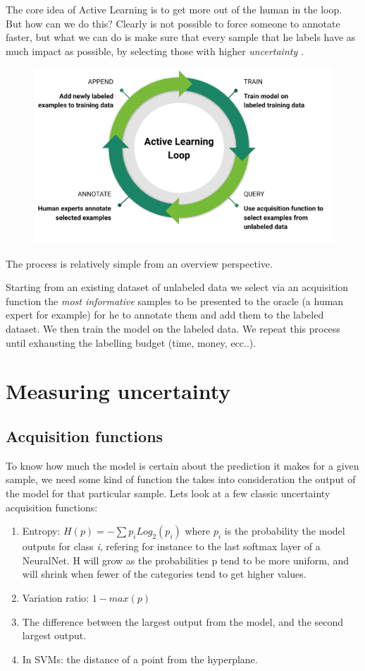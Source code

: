 \documentclass{article}
\begin{document}
\begin{flushleft}
The core idea of Active Learning is to get more out of the human in the loop.
But how can we do this?
Clearly is not possible to force someone to annotate faster, but what we can do is make sure 
that every sample that he labels have as much impact as possible, by selecting those with higher \emph{uncertainty} .


\begin{figure}[h]
    \centering
    \includegraphics[scale=0.5]{AL-loop}
\end{figure}

The process is relatively simple from an overview perspective.

Starting from an existing dataset of unlabeled data we select via an acquisition 
function the \emph{most informative} samples to be presented to the oracle (a human expert for example) 
for he to annotate them and add them to the labeled dataset. We then train the model on the labeled data. 
We repeat this process until exhausting the labelling budget (time, money, ecc..).

\section{Measuring uncertainty}
\subsection{Acquisition functions}
To know how much the model is certain about the prediction it makes for a given sample, 
we need some kind of function the takes into consideration the output of the model for that particular sample.
Lets look at a few classic uncertainty acquisition functions:
\begin{enumerate}
    \item Entropy: $H(p) = - \sum{p_iLog_2(p_i)}$ where $p_i$ is the probability the model outputs for class \emph{i}, 
    refering for instance to the last softmax layer of a NeuralNet.
    H will grow as the probabilities p tend to be more uniform, and will shrink when fewer of the categories tend to get higher values.
    \item Variation ratio: $1 - max(p)$
    \item The difference between the largest output from the model, and the second largest output.
    \item In SVMs: the distance of a point from the hyperplane.
\end{enumerate}

\end{flushleft}
\end{document}
